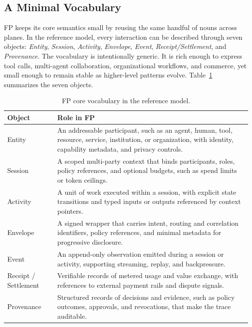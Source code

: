 \documentclass{llmxive}
\begin{document}
\subsection{A Minimal Vocabulary}
\label{subsec:vocab}

FP keeps its core semantics small by reusing the same handful of nouns across planes. In the reference model, every interaction can be described through seven objects: \emph{Entity}, \emph{Session}, \emph{Activity}, \emph{Envelope}, \emph{Event}, \emph{Receipt/Settlement}, and \emph{Provenance}. The vocabulary is intentionally generic. It is rich enough to express tool calls, multi-agent collaboration, organizational workflows, and commerce, yet small enough to remain stable as higher-level patterns evolve. Table~\ref{tab:vocab} summarizes the seven objects. 

\begin{table}[ht]
\centering
\footnotesize
\begin{tabular}{@{}p{} p{}@{}}
\toprule
\textbf{Object} & \textbf{Role in FP} \\
\midrule
Entity & An addressable participant, such as an agent, human, tool, resource, service, institution, or organization, with identity, capability metadata, and privacy controls. \\
Session & A scoped multi-party context that binds participants, roles, policy references, and optional budgets, such as spend limits or token ceilings. \\
Activity & A unit of work executed within a session, with explicit state transitions and typed inputs or outputs referenced by context pointers. \\
Envelope & A signed wrapper that carries intent, routing and correlation identifiers, policy references, and minimal metadata for progressive disclosure. \\
Event & An append-only observation emitted during a session or activity, supporting streaming, replay, and backpressure. \\
Receipt / Settlement & Verifiable records of metered usage and value exchange, with references to external payment rails and dispute signals. \\
Provenance & Structured records of decisions and evidence, such as policy outcomes, approvals, and revocations, that make the trace auditable. \\
\bottomrule
\end{tabular}
\caption{FP core vocabulary in the reference model.}
\label{tab:vocab}
\end{table}
\end{document}
